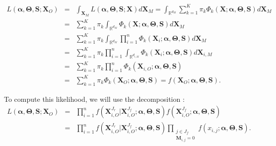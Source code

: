\documentclass[12pt,a4paper]{report}
\begin{document}
\begin{eqnarray}
	L(\boldsymbol{\alpha},\boldsymbol{\Theta},\boldsymbol{S};\boldsymbol{X}_O)&=&\int_{\boldsymbol{X}_M}L(\boldsymbol{\alpha},\boldsymbol{\Theta},\boldsymbol{S};\boldsymbol{X})d\boldsymbol{X}_M 
	=\int_{\mathbb{R}^{d_M}}\sum_{k=1}^K \pi_k \Phi_k(\boldsymbol{X};\boldsymbol{\alpha},\boldsymbol{\Theta},\boldsymbol{S})d\boldsymbol{X}_M  \nonumber \\
	&=&\sum_{k=1}^K \pi_k \int_{\mathbb{R}^{d_M}}\Phi_k(\boldsymbol{X};\boldsymbol{\alpha},\boldsymbol{\Theta},\boldsymbol{S})d\boldsymbol{X}_M  \nonumber \\
	&=&\sum_{k=1}^K \pi_k \int_{\mathbb{R}^{d_M}}\prod_{i=1}^n\Phi_k(\boldsymbol{X}_i;\boldsymbol{\alpha},\boldsymbol{\Theta},\boldsymbol{S})d\boldsymbol{X}_M  \nonumber \\
	&=&\sum_{k=1}^K \pi_k \prod_{i=1}^n\int_{\mathbb{R}^{d_{i,M}}}\Phi_k(\boldsymbol{X}_i;\boldsymbol{\alpha},\boldsymbol{\Theta},\boldsymbol{S})d\boldsymbol{X}_{i,M} \nonumber  \\
	&=&\sum_{k=1}^K \pi_k \prod_{i=1}^n\Phi_k(\boldsymbol{X}_{i,O};\boldsymbol{\alpha},\boldsymbol{\Theta},\boldsymbol{S}) \nonumber \\
	&=&\sum_{k=1}^K \pi_k \Phi_k(\boldsymbol{X}_{O};\boldsymbol{\alpha},\boldsymbol{\Theta},\boldsymbol{S})=f(\boldsymbol{X}_{O};\boldsymbol{\alpha},\boldsymbol{\Theta},\boldsymbol{S}). \nonumber 
\end{eqnarray}






To compute this likelihood, we will use the decomposition :
\begin{eqnarray}
	L(\boldsymbol{\alpha},\boldsymbol{\Theta},\boldsymbol{S};\boldsymbol{X}_O)&=& %
	\prod_{i=1}^nf(\boldsymbol{X}^{J_r}_{i,O}|\boldsymbol{X}^{J_f}_{i,O};\boldsymbol{\alpha},\boldsymbol{\Theta},\boldsymbol{S})f(\boldsymbol{X}^{J_f}_{i,O};\boldsymbol{\alpha},\boldsymbol{\Theta},\boldsymbol{S})\quad   \nonumber \\
	&=&\prod_{i=1}^nf(\boldsymbol{X}^{J_r}_{i,O}|\boldsymbol{X}^{J_f}_{i,O};\boldsymbol{\alpha},\boldsymbol{\Theta},\boldsymbol{S})\prod_{\substack{j \in J_f \\ \boldsymbol{M}_{i,j}=0}}f(x_{i,j};\boldsymbol{\alpha},\boldsymbol{\Theta},\boldsymbol{S}).\label{likmiss}
\end{eqnarray}
\end{document}
